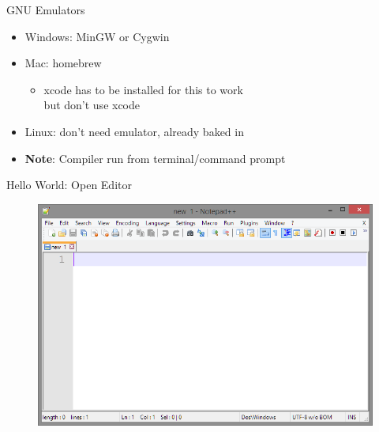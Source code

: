 \documentclass[xcolor={dvipsnames}]{beamer}
\begin{document}
\begin{frame}{GNU Emulators}
	\begin{itemize}
		\item Windows: MinGW or Cygwin
		\item Mac: homebrew 
			\begin{itemize}		
				\item xcode has to be installed for this to work\\
					but don't use xcode
			\end{itemize}
		\item Linux: don't need emulator, already baked in
		\item \textbf{Note}: Compiler run from terminal/command prompt
	\end{itemize}
\end{frame}

\begin{frame}{Hello World: Open Editor}
	\begin{figure}
			\includegraphics[width=1\textwidth]{empty}
	\end{figure}
\end{frame}
\end{document}
